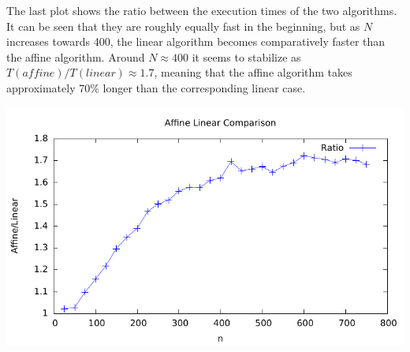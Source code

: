 The last plot shows the ratio between the execution times of the two
algorithms. It can be seen that they are roughly equally fast in the
beginning, but as $N$ increases towards 400, the linear algorithm
becomes comparatively faster than the affine algorithm. Around $N
\approx 400$ it seems to stabilize as $T(affine)/T(linear) \approx
1.7$, meaning that the affine algorithm takes approximately 70\%
longer than the corresponding linear case.
\begin{center}
	\includegraphics[width=\textwidth]{../plots/plot3.pdf}
\end{center}
